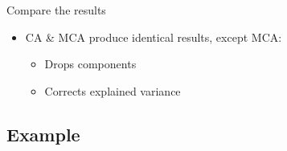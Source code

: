 \documentclass[
  ignorenonframetext,
]{beamer}
\providecommand{\tightlist}{%
  \setlength{\itemsep}{0pt}\setlength{\parskip}{0pt}}
\begin{document}
\begin{frame}{Compare the results}
\protect\hypertarget{compare-the-results-1}{}

\begin{table}[H]
\centering
{}
\end{table}

\begin{itemize}[<+->]
\tightlist
\item
  CA \& MCA produce identical results, except MCA:

  \begin{itemize}[<+->]
  \tightlist
  \item
    Drops components
  \item
    Corrects explained variance
  \end{itemize}
\end{itemize}

\end{frame}

\hypertarget{example-1}{%
\subsection{Example}\label{example-1}}
\end{document}
